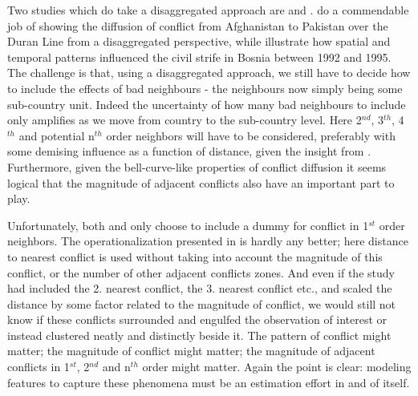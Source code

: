 \documentclass[a4paper]{article}
\begin{document}
Two studies which do take a disaggregated approach are \cite{ol2010afghanistan} and \cite{weidmann_ward_2010predicting}. \cite{ol2010afghanistan} do a commendable job of showing the diffusion of conflict from Afghanistan to Pakistan over the Duran Line from a disaggregated perspective, while \cite{weidmann_ward_2010predicting} illustrate how spatial and temporal patterns influenced the civil strife in Bosnia between 1992 and 1995. The challenge is that, using a disaggregated approach, we still have to decide how to include the effects of bad neighbours - the neighbours now simply being some sub-country unit. Indeed the uncertainty of how many bad neighbours to include only amplifies as we move from country to the sub-country level. Here 2$^{nd}$, 3$^{th}$, 4$^{th}$ and potential n$^{th}$ order neighbors will have to be considered, preferably with some demising influence as a function of distance, given the insight from \cite{schutte2011diffusion}. Furthermore, given the bell-curve-like properties of conflict diffusion it seems logical that the magnitude of adjacent conflicts also have an important part to play.\par

Unfortunately, both \cite{ol2010afghanistan} and \cite{weidmann_ward_2010predicting} only choose to include a dummy for conflict in 1$^{st}$ order neighbors. The operationalization presented in \cite{Maase} is hardly any better; here distance to nearest conflict is used without taking into account the magnitude of this conflict, or the number of other adjacent conflicts zones. And even if the study had included the 2. nearest conflict, the 3. nearest conflict etc., and scaled the distance by some factor related to the magnitude of conflict, we would still not know if these conflicts surrounded and engulfed the observation of interest or instead clustered neatly and distinctly beside it. The pattern of conflict might matter; the magnitude of conflict might matter; the magnitude of adjacent conflicts in 1$^{st}$, 2$^{nd}$ and n$^{th}$ order might matter. Again the point is clear: modeling features to capture these phenomena must be an estimation effort in and of itself.\par



\end{document}

